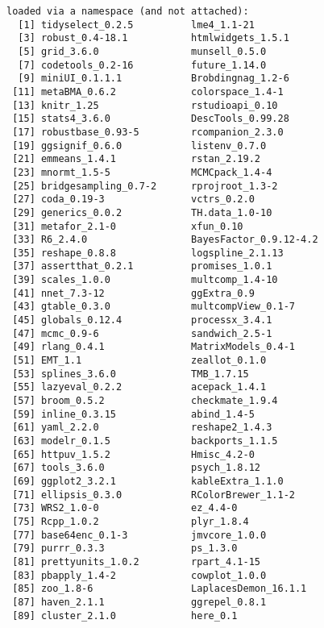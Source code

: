 \documentclass[]{article}
\begin{document}
\begin{verbatim}
loaded via a namespace (and not attached):
  [1] tidyselect_0.2.5          lme4_1.1-21              
  [3] robust_0.4-18.1           htmlwidgets_1.5.1        
  [5] grid_3.6.0                munsell_0.5.0            
  [7] codetools_0.2-16          future_1.14.0            
  [9] miniUI_0.1.1.1            Brobdingnag_1.2-6        
 [11] metaBMA_0.6.2             colorspace_1.4-1         
 [13] knitr_1.25                rstudioapi_0.10          
 [15] stats4_3.6.0              DescTools_0.99.28        
 [17] robustbase_0.93-5         rcompanion_2.3.0         
 [19] ggsignif_0.6.0            listenv_0.7.0            
 [21] emmeans_1.4.1             rstan_2.19.2             
 [23] mnormt_1.5-5              MCMCpack_1.4-4           
 [25] bridgesampling_0.7-2      rprojroot_1.3-2          
 [27] coda_0.19-3               vctrs_0.2.0              
 [29] generics_0.0.2            TH.data_1.0-10           
 [31] metafor_2.1-0             xfun_0.10                
 [33] R6_2.4.0                  BayesFactor_0.9.12-4.2   
 [35] reshape_0.8.8             logspline_2.1.13         
 [37] assertthat_0.2.1          promises_1.0.1           
 [39] scales_1.0.0              multcomp_1.4-10          
 [41] nnet_7.3-12               ggExtra_0.9              
 [43] gtable_0.3.0              multcompView_0.1-7       
 [45] globals_0.12.4            processx_3.4.1           
 [47] mcmc_0.9-6                sandwich_2.5-1           
 [49] rlang_0.4.1               MatrixModels_0.4-1       
 [51] EMT_1.1                   zeallot_0.1.0            
 [53] splines_3.6.0             TMB_1.7.15               
 [55] lazyeval_0.2.2            acepack_1.4.1            
 [57] broom_0.5.2               checkmate_1.9.4          
 [59] inline_0.3.15             abind_1.4-5              
 [61] yaml_2.2.0                reshape2_1.4.3           
 [63] modelr_0.1.5              backports_1.1.5          
 [65] httpuv_1.5.2              Hmisc_4.2-0              
 [67] tools_3.6.0               psych_1.8.12             
 [69] ggplot2_3.2.1             kableExtra_1.1.0         
 [71] ellipsis_0.3.0            RColorBrewer_1.1-2       
 [73] WRS2_1.0-0                ez_4.4-0                 
 [75] Rcpp_1.0.2                plyr_1.8.4               
 [77] base64enc_0.1-3           jmvcore_1.0.0            
 [79] purrr_0.3.3               ps_1.3.0                 
 [81] prettyunits_1.0.2         rpart_4.1-15             
 [83] pbapply_1.4-2             cowplot_1.0.0            
 [85] zoo_1.8-6                 LaplacesDemon_16.1.1     
 [87] haven_2.1.1               ggrepel_0.8.1            
 [89] cluster_2.1.0             here_0.1                 

\end{verbatim}
\end{document}
